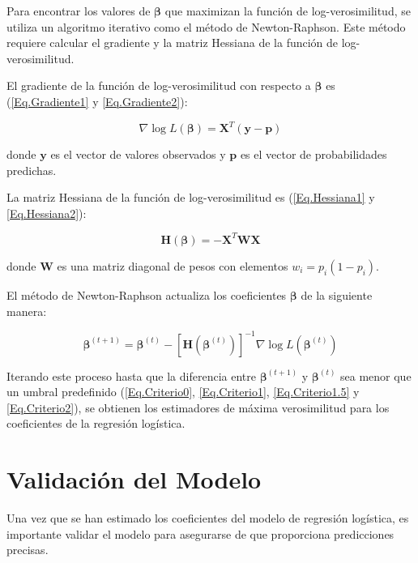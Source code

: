 \documentclass[a4paper]{report} %
\begin{document}
Para encontrar los valores de $\boldsymbol{\beta}$ que maximizan la funci\'on de log-verosimilitud, se utiliza un algoritmo iterativo como el m\'etodo de Newton-Raphson. Este m\'etodo requiere calcular el gradiente y la matriz Hessiana de la funci\'on de log-verosimilitud.


El gradiente de la funci\'on de log-verosimilitud con respecto a $\boldsymbol{\beta}$ es (\ref{Eq.Gradiente1} y \ref{Eq.Gradiente2}):

\begin{equation}
\nabla \log L(\boldsymbol{\beta}) = \mathbf{X}^T (\mathbf{y} - \mathbf{p})
\end{equation}

donde $\mathbf{y}$ es el vector de valores observados y $\mathbf{p}$ es el vector de probabilidades predichas.

La matriz Hessiana de la funci\'on de log-verosimilitud es (\ref{Eq.Hessiana1} y \ref{Eq.Hessiana2}):

\begin{equation}
\mathbf{H}(\boldsymbol{\beta}) = -\mathbf{X}^T \mathbf{W} \mathbf{X}
\end{equation}

donde $\mathbf{W}$ es una matriz diagonal de pesos con elementos $w_i = p_i (1 - p_i)$.

El m\'etodo de Newton-Raphson actualiza los coeficientes $\boldsymbol{\beta}$ de la siguiente manera:

\begin{equation}\label{Eq.Criterio3}
\boldsymbol{\beta}^{(t+1)} = \boldsymbol{\beta}^{(t)} - [\mathbf{H}(\boldsymbol{\beta}^{(t)})]^{-1} \nabla \log L(\boldsymbol{\beta}^{(t)})
\end{equation}

Iterando este proceso hasta que la diferencia entre $\boldsymbol{\beta}^{(t+1)}$ y $\boldsymbol{\beta}^{(t)}$ sea menor que un umbral predefinido (\ref{Eq.Criterio0}, \ref{Eq.Criterio1}, \ref{Eq.Criterio1.5} y \ref{Eq.Criterio2}), se obtienen los estimadores de m\'axima verosimilitud para los coeficientes de la regresi\'on log\'istica.

\section{Validaci\'on del Modelo}

Una vez que se han estimado los coeficientes del modelo de regresi\'on log\'istica, es importante validar el modelo para asegurarse de que proporciona predicciones precisas.
\end{document}

